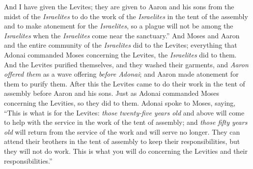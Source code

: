 \begin{biblechapter}
\verse And I have given the Levites; they are given to Aaron and his sons from the midst of the \textit{Israelites} to do the work of the \textit{Israelites} in the tent of the assembly and to make atonement for the \textit{Israelites}, so a plague will not be among the \textit{Israelites} when the \textit{Israelites} come near the sanctuary.”
\verse And Moses and Aaron and the entire community of the \textit{Israelites} did to the Levites; everything that Adonai commanded Moses concerning the Levites, the \textit{Israelites} did to them.
\verse And the Levites purified themselves, and they washed their garments, and \textit{Aaron offered them} as a wave offering \textit{before Adonai}; and Aaron made atonement for them to purify them.
\verse After this the Levites came to do their work in the tent of assembly before Aaron and his sons. Just as Adonai commanded Moses concerning the Levities, so they did to them.
\verse Adonai spoke to Moses, saying,
\verse “This is what is for the Levites: \textit{those twenty-five years old} and above will come to help with the service in the work of the tent of assembly;
\verse and \textit{those fifty years old} will return from the service of the work and will serve no longer.
\verse They can attend their brothers in the tent of assembly to keep their responsibilities, but they will not do work. This is what you will do concerning the Levities and their responsibilities.”
\end{biblechapter}

